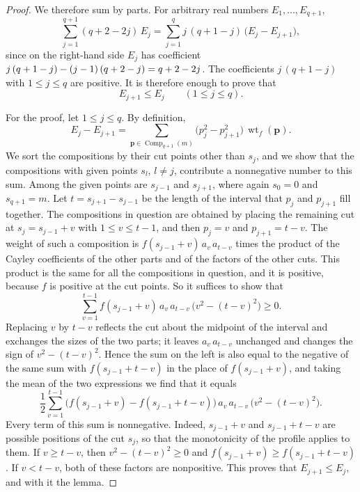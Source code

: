 \documentclass{amsart}
\theoremstyle{definition}
\theoremstyle{remark}
\numberwithin{equation}{section}
\begin{document}
\begin{proof}
We therefore sum by parts. For arbitrary real numbers $E_1,\dots,E_{q+1}$,
\[
\sum_{j=1}^{q+1}(q+2-2j)\,E_j=\sum_{j=1}^{q}j\,(q+1-j)\,\bigl(E_j-E_{j+1}\bigr),
\]
since on the right-hand side $E_j$ has coefficient $j\,(q+\nobreak 1-\nobreak j)-(j-\nobreak 1)\,(q+\nobreak 2-\nobreak j)=q+2-2j$. The coefficients $j\,(q+1-j)$ with $1\le j\le q$ are positive. It is therefore enough to prove that
\[
E_{j+1}\le E_j\qquad(1\le j\le q).
\]

For the proof, let $1\le j\le q$. By definition,
\[
E_j-E_{j+1}=\sum_{\mathbf p\in\operatorname{Comp}_{q+1}(m)}\bigl(p_j^{2}-p_{j+1}^{2}\bigr)\,\operatorname{wt}_f(\mathbf p).
\]
We sort the compositions by their cut points other than $s_j$, and we show that the compositions with given points $s_l$, $l\ne j$, contribute a nonnegative number to this sum. Among the given points are $s_{j-1}$ and $s_{j+1}$, where again $s_0=0$ and $s_{q+1}=m$. Let $t=s_{j+1}-s_{j-1}$ be the length of the interval that $p_j$ and $p_{j+1}$ fill together. The compositions in question are obtained by placing the remaining cut at $s_j=s_{j-1}+v$ with $1\le v\le t-1$, and then $p_j=v$ and $p_{j+1}=t-v$. The weight of such a composition is $f(s_{j-1}+v)\,a_v\,a_{t-v}$ times the product of the Cayley coefficients of the other parts and of the factors of the other cuts. This product is the same for all the compositions in question, and it is positive, because $f$ is positive at the cut points. So it suffices to show that
\[
\sum_{v=1}^{t-1}f(s_{j-1}+v)\,a_v\,a_{t-v}\,\bigl(v^{2}-(t-v)^{2}\bigr)\ge 0 .
\]
Replacing $v$ by $t-v$ reflects the cut about the midpoint of the interval and exchanges the sizes of the two parts; it leaves $a_v\,a_{t-v}$ unchanged and changes the sign of $v^{2}-(t-v)^{2}$. Hence the sum on the left is also equal to the negative of the same sum with $f(s_{j-1}+t-v)$ in the place of $f(s_{j-1}+v)$, and taking the mean of the two expressions we find that it equals
\[
\frac12\sum_{v=1}^{t-1}\bigl(f(s_{j-1}+v)-f(s_{j-1}+t-v)\bigr)\,a_v\,a_{t-v}\,\bigl(v^{2}-(t-v)^{2}\bigr).
\]
Every term of this sum is nonnegative. Indeed, $s_{j-1}+v$ and $s_{j-1}+t-v$ are possible positions of the cut $s_j$, so that the monotonicity of the profile applies to them. If $v\ge t-v$, then $v^{2}-(t-v)^{2}\ge 0$ and $f(s_{j-1}+v)\ge f(s_{j-1}+t-v)$. If $v<t-v$, both of these factors are nonpositive. This proves that $E_{j+1}\le E_j$, and with it the lemma.
\end{proof}
\end{document}
